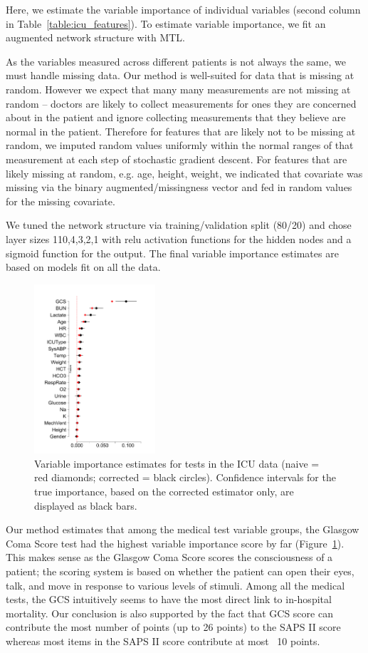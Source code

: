 \documentclass{article}
\begin{document}
Here, we estimate the variable importance of individual variables (second column in Table~\ref{table:icu_features}).
To estimate variable importance, we fit an augmented network structure with MTL.

As the variables measured across different patients is not always the same, we must handle missing data.
Our method is well-suited for data that is missing at random.
However we expect that many many measurements are not missing at random -- doctors are likely to collect measurements for ones they are concerned about in the patient and ignore collecting measurements that they believe are normal in the patient.
Therefore for features that are likely not to be missing at random, we imputed random values uniformly within the normal ranges of that measurement at each step of stochastic gradient descent.
For features that are likely missing at random, e.g. age, height, weight, we indicated that covariate was missing via the binary augmented/missingness vector and fed in random values for the missing covariate.

We tuned the network structure via training/validation split (80/20) and chose layer sizes 110,4,3,2,1 with relu activation functions for the hidden nodes and a sigmoid function for the output.
The final variable importance estimates are based on models fit on all the data.

\begin{figure}
 \includegraphics[width=0.4\textwidth]{images/icu_individual}
\caption{
	Variable importance estimates for tests in the ICU data (naive = red diamonds; corrected = black circles). Confidence intervals for the true importance, based on the corrected estimator only, are displayed as black bars.
}
\label{fig:icu_dat}
\end{figure}

Our method estimates that among the medical test variable groups, the Glasgow Coma Score test had the highest variable importance score by far (Figure~\ref{fig:icu_dat}).
This makes sense as the Glasgow Coma Score scores the consciousness of a patient; the scoring system is based on whether the patient can open their eyes, talk, and move in response to various levels of stimuli.
Among all the medical tests, the GCS intuitively seems to have the most direct link to in-hospital mortality.
Our conclusion is also supported by the fact that GCS score can contribute the most number of points (up to 26 points) to the SAPS II score whereas most items in the SAPS II score contribute at most ~10 points.
\end{document}
